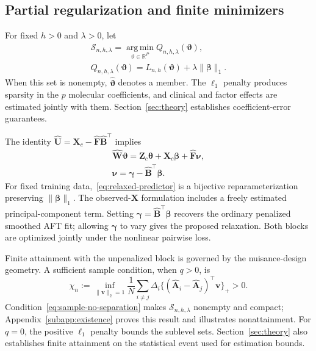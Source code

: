 \subsection{Partial regularization and finite minimizers}
\label{subsec:partial-penalty}
For fixed $h>0$ and $\lambda>0$, let
\begin{equation}
 \begin{gathered}
\mathcal S_{n,h,\lambda}
 =\operatorname*{arg\,min}_{\vartheta\in\mathbb R^P}
 Q_{n,h,\lambda}(\bm{\vartheta}),\\
 Q_{n,h,\lambda}(\bm{\vartheta})=L_{n,h}(\bm{\vartheta})+\lambda\|\bm{\beta}\|_1.
 \end{gathered}
 \label{eq:estimator-set}
\end{equation}
When this set is nonempty, $\widehat{\bm{\vartheta}}$ denotes a member. The $\ell_1$ penalty produces sparsity in the $p$ molecular coefficients, and clinical and factor effects are estimated jointly with them. Section~\ref{sec:theory} establishes coefficient-error guarantees.

The identity $\widehat{\bm{U}}=\bm{X}_c-\widehat{\bm{F}}\widehat{\bm{B}}^\top$ implies
\begin{equation}
 \begin{gathered}
\widehat{\bm{W}}\bm{\vartheta}
 =\bm{Z}_c\bm{\theta}+\bm{X}_c\bm{\beta}+\widehat{\bm{F}}\bm{\nu},
 \\
 \bm{\nu}=\bm{\gamma}-\widehat{\bm{B}}^\top\bm{\beta}.
 \end{gathered}
 \label{eq:relaxed-predictor}
\end{equation}
For fixed training data,~\eqref{eq:relaxed-predictor} is a bijective reparameterization preserving $\|\bm{\beta}\|_1$. The observed-$\bm{X}$ formulation includes a freely estimated principal-component term. Setting $\bm{\gamma}=\widehat{\bm{B}}^\top\bm{\beta}$ recovers the ordinary penalized smoothed AFT fit; allowing $\bm{\gamma}$ to vary gives the proposed relaxation. Both blocks are optimized jointly under the nonlinear pairwise loss.

Finite attainment with the unpenalized block is governed by the nuisance-design geometry. A sufficient sample condition, when $q>0$, is
\begin{equation}
 \chi_n:=\inf_{\|\bm{v}\|_2=1}
 \frac1N\sum_{i\ne j}\Delta_i
       \{(\widehat{\bm{A}}_i-\widehat{\bm{A}}_j)^\top \bm{v}\}_+>0.
 \label{eq:sample-no-separation}
\end{equation}
Condition~\eqref{eq:sample-no-separation} makes $\mathcal S_{n,h,\lambda}$ nonempty and compact; Appendix~\ref{subapp:existence} proves this result and illustrates nonattainment. For $q=0$, the positive $\ell_1$ penalty bounds the sublevel sets. Section~\ref{sec:theory} also establishes finite attainment on the statistical event used for estimation bounds.

